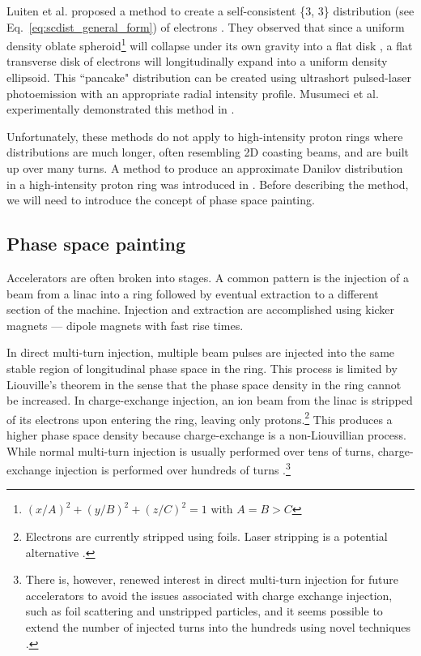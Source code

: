 Luiten et al. proposed a method to create a self-consistent \{3, 3\} distribution (see Eq.~\eqref{eq:scdist_general_form}) of electrons \cite{Luiten2004}. They observed that since a uniform density oblate spheroid\footnote{$(x/A)^2 + (y/B)^2 + (z/C)^2 = 1$ with $A = B > C$} will collapse under its own gravity into a flat disk \cite{Lin1965}, a flat transverse disk of electrons will longitudinally expand into a uniform density ellipsoid. This ``pancake" distribution can be created using ultrashort pulsed-laser photoemission with an appropriate radial intensity profile. Musumeci et al. experimentally demonstrated this method in \cite{Musumeci2008}. 

Unfortunately, these methods do not apply to high-intensity proton rings where distributions are much longer, often resembling 2D coasting beams, and are built up over many turns. A method to produce an approximate Danilov distribution in a high-intensity proton ring was introduced in \cite{Danilov2003}. Before describing the method, we will need to introduce the concept of phase space painting. 


\subsection{Phase space painting}

Accelerators are often broken into stages. A common pattern is the injection of a beam from a linac into a ring followed by eventual extraction to a different section of the machine. Injection and extraction are accomplished using kicker magnets — dipole magnets with fast rise times.

In direct multi-turn injection, multiple beam pulses are injected into the same stable region of longitudinal phase space in the ring. This process is limited by Liouville's theorem in the sense that the phase space density in the ring cannot be increased. In charge-exchange injection, an ion beam from the linac is stripped of its electrons upon entering the ring, leaving only protons.\footnote{Electrons are currently stripped using foils. Laser stripping is a potential alternative \cite{Cousineau2017}.} This produces a higher phase space density because charge-exchange is a non-Liouvillian process. While normal multi-turn injection is usually performed over tens of turns, charge-exchange injection is performed over hundreds of turns \cite{Bracco2017}.\footnote{There is, however, renewed interest in direct multi-turn injection for future accelerators to avoid the issues associated with charge exchange injection, such as foil scattering and unstripped particles, and it seems possible to extend the number of injected turns into the hundreds using novel techniques \cite{Prior2016}.} 

